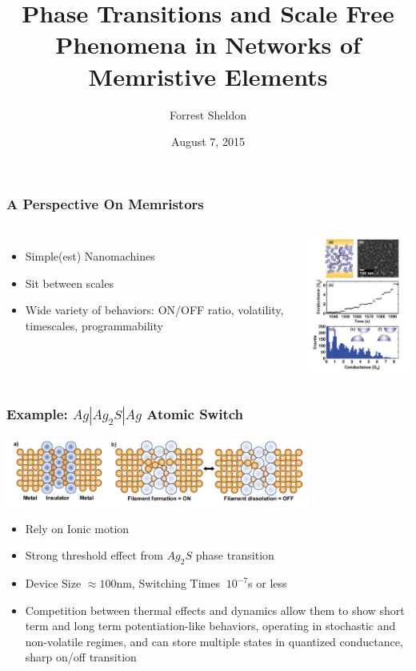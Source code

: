 \documentclass[mathserif]{beamer}
\title{Phase Transitions and Scale Free Phenomena in Networks of Memristive Elements}
\author{Forrest Sheldon}
\institute{UCSD}
\date{August 7, 2015}
\begin{document}
\begin{frame}
\titlepage
\end{frame}

\begin{frame}
\frametitle{A Perspective On Memristors}

\begin{columns}
\begin{itemize}
\item Simple(est) Nanomachines
\item Sit between scales
\item Wide variety of behaviors: ON/OFF ratio, volatility, timescales, programmability

\end{itemize}
\includegraphics[width=5cm]{Granular_Material.png}
\end{columns}
\end{frame}

\begin{frame}
\frametitle{Example: $Ag|Ag_2 S|Ag$ Atomic Switch}
\begin{center}
\includegraphics[width=10cm]{Atomic_Switch_Filament.png}
\end{center}
\begin{itemize}
\item Rely on Ionic motion
\item Strong threshold effect from $Ag_2 S$ phase transition
\item Device Size $\approx 100$nm, Switching Times $~10^{-7}$s or less
\item Competition between thermal effects and dynamics allow them to show short term and long term potentiation-like behaviors,
operating in stochastic and non-volatile regimes, and can store multiple states in quantized conductance, sharp on/off transition
\end{itemize}
\end{frame}
\end{document}
